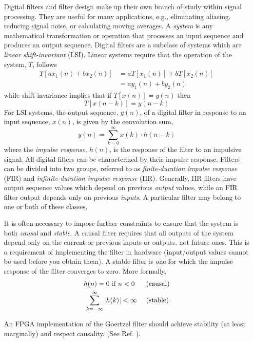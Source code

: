 \documentclass[reprint,amsmath,amssymb,aps,pra]{revtex4-2}
\begin{document}
Digital filters and filter design make up their own branch of study within signal processing. They are useful for many applications, e.g., eliminating aliasing, reducing signal noise, or calculating moving averages. A \textit{system} is any mathematical transformation or operation that processes an input sequence and produces an output sequence. Digital filters are a subclass of systems which are \textit{linear shift-invariant} (LSI). Linear systems require that the operation of the system, $T$, follows
\begin{align*}
    T[a x_1(n) + b x_2(n)] & = a T[x_1(n)] + b T[x_2(n)] \\
    & = a y_1(n) + b y_2(n) 
\end{align*}
while shift-invariance implies that if $T[x(n)] = y(n)$ then
$$
T[x(n-k)] = y(n-k)
$$
For LSI systems, the output sequence, $y(n)$, of a digital filter in response to an input sequence, $x(n)$, is given by the convolution sum,
\begin{equation}
    y(n) = \sum_{k=0}^{\infty}x(k)\cdot h(n-k)
\end{equation}
where the \textit{impulse response}, $h(n)$, is the response of the filter to an impulsive signal. All digital filters can be characterized by their impulse response. Filters can be divided into two groups, referred to as \textit{finite-duration impulse response} (FIR) and \textit{infinite-duration impulse response} (IIR). Generally, IIR filters have output sequence values which depend on previous \textit{output} values, while an FIR filter output depends only on previous \textit{inputs}. A particular filter may belong to one or both of these classes.

It is often necessary to impose further constraints to ensure that the system is both \textit{causal} and \textit{stable}. A causal filter requires that all outputs of the system depend only on the current or previous inputs or outputs, not future ones. This is a requirement of implementing the filter in hardware (input/output values cannot be used before you obtain them). A stable filter is one for which the impulse response of the filter converges to zero. More formally,
\begin{align*}
    h(n) = 0 \text{ if } n < 0 \ \ \ \ \ & \text{(causal)} \nonumber \\
   \sum_{k=-\infty}^\infty{\abs{h(k)}} < \infty \ \ \ \ & \text{(stable)} \nonumber
\end{align*}

An FPGA implementation of the Goertzel filter should achieve stability (at least marginally) and respect causality. (See Ref. \cite{DSP}).
\end{document}
